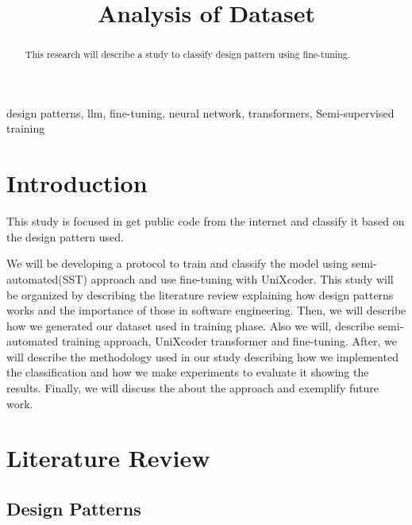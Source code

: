 \documentclass[conference]{IEEEtran}
\begin{document}
\title{Analysis of Dataset\\
}

\author{
}

\maketitle

\begin{abstract}
This research will describe a study to classify design pattern using fine-tuning.
\end{abstract}

\begin{IEEEkeywords}
design patterns, llm, fine-tuning, neural network, transformers, Semi-supervised training
\end{IEEEkeywords}

\section{Introduction}

This study is focused in get public code from the internet and classify it based on the design pattern used.

We will be developing a protocol to train and classify the model using semi-automated\cite{5291929}(SST) approach and use fine-tuning with UniXcoder\cite{guo2022unixcoder}.
This study will be organized by describing the literature review explaining how design patterns works and the importance of those in software engineering. 
Then, we will describe how we generated our dataset used in training phase. Also we will, describe semi-automated training approach, UniXcoder transformer and fine-tuning.
After, we will describe the methodology used in our study describing how we implemented the classification and how we make experiments to evaluate it showing the results.
Finally, we will discuss the about the approach and exemplify future work.

\section{Literature Review}

\subsection{Design Patterns}
\end{document}
